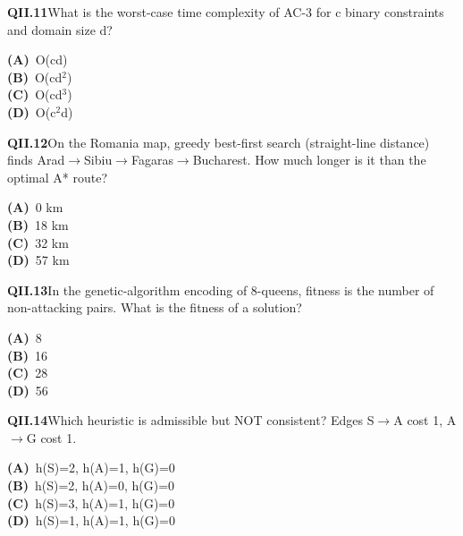 \documentclass[11pt]{article}
\begin{document}
\begin{tcolorbox}[enhanced,breakable,colback=white,colframe=navyL,arc=2mm,boxrule=0.7pt,left=3mm,right=3mm,top=2mm,bottom=2mm]
\textbf{\color{navy}QII.11}\quad What is the worst-case time complexity of AC-3 for c binary constraints and domain size d?\hfill{}\par\smallskip
{\small \textbf{\color{navyL}(A)}\ O(cd)\\[1pt]\textbf{\color{navyL}(B)}\ O(cd$^2$)\\[1pt]\textbf{\color{navyL}(C)}\ O(cd$^3$)\\[1pt]\textbf{\color{navyL}(D)}\ O(c$^2$d)}
\end{tcolorbox}
\begin{tcolorbox}[enhanced,breakable,colback=white,colframe=navyL,arc=2mm,boxrule=0.7pt,left=3mm,right=3mm,top=2mm,bottom=2mm]
\textbf{\color{navy}QII.12}\quad On the Romania map, greedy best-first search (straight-line distance) finds Arad$\to$Sibiu$\to$Fagaras$\to$Bucharest. How much longer is it than the optimal A* route?\hfill{}\par\smallskip
{\small \textbf{\color{navyL}(A)}\ 0 km\\[1pt]\textbf{\color{navyL}(B)}\ 18 km\\[1pt]\textbf{\color{navyL}(C)}\ 32 km\\[1pt]\textbf{\color{navyL}(D)}\ 57 km}
\end{tcolorbox}
\begin{tcolorbox}[enhanced,breakable,colback=white,colframe=navyL,arc=2mm,boxrule=0.7pt,left=3mm,right=3mm,top=2mm,bottom=2mm]
\textbf{\color{navy}QII.13}\quad In the genetic-algorithm encoding of 8-queens, fitness is the number of non-attacking pairs. What is the fitness of a solution?\hfill{}\par\smallskip
{\small \textbf{\color{navyL}(A)}\ 8\\[1pt]\textbf{\color{navyL}(B)}\ 16\\[1pt]\textbf{\color{navyL}(C)}\ 28\\[1pt]\textbf{\color{navyL}(D)}\ 56}
\end{tcolorbox}
\begin{tcolorbox}[enhanced,breakable,colback=white,colframe=navyL,arc=2mm,boxrule=0.7pt,left=3mm,right=3mm,top=2mm,bottom=2mm]
\textbf{\color{navy}QII.14}\quad Which heuristic is admissible but NOT consistent? Edges S$\to$A cost 1, A$\to$G cost 1.\hfill{}\par\smallskip
{\small \textbf{\color{navyL}(A)}\ h(S)=2, h(A)=1, h(G)=0\\[1pt]\textbf{\color{navyL}(B)}\ h(S)=2, h(A)=0, h(G)=0\\[1pt]\textbf{\color{navyL}(C)}\ h(S)=3, h(A)=1, h(G)=0\\[1pt]\textbf{\color{navyL}(D)}\ h(S)=1, h(A)=1, h(G)=0}
\end{tcolorbox}
\end{document}
